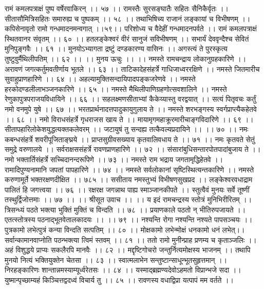 रामं कमलपत्राक्षं पुष्प वर्षेरवाकिरन् ।। ५७ ।।
रामस्तैः सुरसङ्घातैः सहितः सैनिकैर्वृतः ।।
सीतासौमित्रिसहितः समारुह्य च पुष्पकम् ।। ५८ ।।
तथाभिषिच्य राजानं लङ्कायां च विभीषणम् ।।
कपिसेनावृतो रामो गन्धमादनमन्वगात् ।।५९।।
परिशोध्य च वैदेहीं गन्धमादनपर्वते ।।
रामं कमलपत्राक्षं स्थितवानर संवृतम् ।। ६० ।।
हतलङ्केश्वरं वीरं सानुजं सविभीषणम् ।।
सभार्यं देववृन्दैश्च सेवितं मुनिपुङ्गवैः ।। ६१ ।।
मुनयोऽभ्यागता द्रष्टुं दण्डकारण्य वासिनः ।।
अगस्त्यं ते पुरस्कृत्य तुष्टुवुर्मैथिलीपतिम् ।। ६२ ।।
।। मुनय ऊचुः ।। ।।
नमस्ते रामचन्द्राय लोकानुग्रहकारिणे ।।
अरावणं जगत्कर्तुमवतीर्णाय भूतले ।। ६३ ।।
ताटिकादेहसंहर्त्रे गाधिजाध्वररक्षिणे ।।
नमस्ते जितमारीच सुवाहुप्राणहारिणे ।। ६४ ।।
अहल्यामुक्तिसन्दायिपादपङ्कजरेणवे ।।
नमस्ते हरकोदण्डलीलाभञ्जनकारिणे ।। ६५ ।।
नमस्ते मैथिलीपाणिग्रहणोत्सवशालिने ।।
नमस्ते रेणुकापुत्रपराजयविधायिने ।। ६६ ।।
सहलक्ष्मणसीताभ्यां कैकेय्यास्तु वरद्वयात् ।।
सत्यं पितृवचः कर्तुं नमो वनमुपे युषे ।। ६७ ।।
भरतप्रार्थनादत्तपादुकायुगुलाय ते ।।
नमस्ते शरभङ्गस्य स्वर्गप्राप्त्यैकहेतवे ।। ६८ ।।
नमो विराधसंहर्त्रे गृधराजस खाय ते ।।
मायामृगमहाक्रूरमारीचाङ्गविदारिणे ।। ६९ ।।
सीतापहारिलोकेशयुद्धत्यक्तकलेवरम् ।।
जटायुषं तु सन्दह्य तत्कैवल्यप्रदायिने ।। ।। ७० ।।
नमः कबन्धसंहर्त्रे शवरीपूजिताङ्घ्रये ।।
प्राप्तसुग्रीवसख्याय कृतवालिवधाय ते ।। ७१ ।।
नमः कृतवते सेतुं समुद्रे वरुणालये ।।
सर्वराक्षससंहर्त्रे रावणप्राणहारिणे ।। ७२ ।।
संसारांबुधिसन्तारपोतपादांबुजाय ते ।।
नमो भक्तार्तिसंहर्त्रे सच्चिदानन्दरूपिणे ।। ७३ ।।
नमस्ते राम भद्राय जगतामृद्धिहेतवे ।।
रामादिपुण्यनामानि जपतां पापहारिणे ।। ७४ ।।
नमस्ते सर्वलोकानां सृष्टिस्थित्यन्तकारिणे ।।
नमस्ते करुणामूर्ते भक्तरक्षणदीक्षित ।। ७८५ ।।
ससीताय नमस्तुभ्यं विभीषणसुखप्रद ।।
लङ्केश्वरवधाद्राम पालितं हि जगत्त्वया ।। ७६ ।।
रक्षरक्ष जगन्नाथ पाह्य स्माञ्जानकीपते ।।
स्तुत्वैवं मुनयः सर्वे तूष्णीं तस्थुर्द्विजोत्तमाः ।। ७७ ।।
।। श्रीसूत उवाच ।। ।।
य इदं रामचन्द्रस्य स्तोत्रं मुनिभिरीरितम् ।।
त्रिसन्ध्यं पठते भक्त्या भुक्तिं मुक्तिं च विन्दति ।। ७८ ।।
प्रयाणकाले पठतो न् भीतिरुपजायते ।।
एतत्स्तोत्रस्य पठनाद्भूतवेतालकादयः ।। ।। ७९ ।।
नश्यन्ति रोगा नश्यन्ति नश्यते पापसञ्चयः ।।
पुत्रकामो लभेत्पुत्रं कन्या विन्दति सत्पतिम् ।। ८० ।।
मोक्षकामो लभेन्मोक्षं धनकामो धनं लभेत्।।
सर्वान्कामानवाप्नोति पठन्भक्त्या त्विमं स्तवम् ।। ८१ ।।
ततो रामो मुनीन्प्राह प्रणम्य च कृताञ्जलिः ।।
अहं विशुद्धये प्राप्यः सकलैरपि मानवैः ।। ८२ ।।
मद्दृष्टिगोचरो जन्तुर्नित्यमोक्षस्य भाजनम् ।।
तथापि मुनयो नित्यं भक्तियुक्तेन चेतसा ।। ८३ ।।
स्वात्मलाभेन सन्तुष्टान्साधून्भूतसुहृत्तमान् ।।
निरहङ्कारिणः शान्तान्नमस्याम्यूर्ध्वरेतसः ।। ८४ ।।
यस्माद्ब्रह्मण्यदेवोऽहमतो विप्रान्भजे सदा ।।
युष्मान्पृच्छाम्यहं किञ्चित्तद्वदध्वं विचार्य तु ।। ८५ ।।
रावणस्य वधाद्विप्रा यत्पापं मम वर्तते ।।
